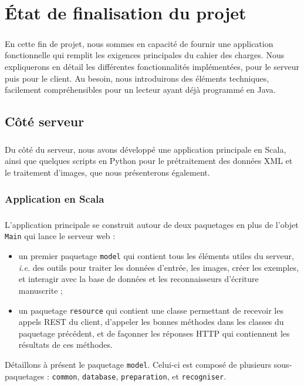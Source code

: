 \chapter{État de finalisation du projet}

\paragraph{}
En cette fin de projet, nous sommes en capacité de fournir une application fonctionnelle qui remplit les exigences principales du cahier des charges. Nous expliquerons en détail les différentes fonctionnalités implémentées, pour le serveur puis pour le client. Au besoin, nous introduirons des éléments techniques, facilement compréhensibles pour un lecteur ayant déjà programmé en Java.

\section{Côté serveur}

\paragraph{}
Du côté du serveur, nous avons développé une application principale en Scala, ainsi que quelques scripts en Python pour le prétraitement des données XML et le traitement d'images, que nous présenterons également.

\subsection{Application en Scala}

\paragraph{}
L'application principale se construit autour de deux paquetages en plus de l'objet \texttt{Main} qui lance le serveur web :
\begin{itemize}
\item un premier paquetage \texttt{model} qui contient tous les éléments utiles du serveur, \textit{i.e.} des outils pour traiter les données d'entrée, les images, créer les exemples, et interagir avec la base de données et les reconnaisseurs d'écriture manuscrite ;
\item un paquetage \texttt{resource} qui contient une classe permettant de recevoir les appels REST du client, d'appeler les bonnes méthodes dans les classes du paquetage précédent, et de façonner les réponses HTTP qui contiennent les résultats de ces méthodes.
\end{itemize}
Détaillons à présent le paquetage \texttt{model}. Celui-ci est composé de plusieurs sous-paquetages : \texttt{common}, \texttt{database}, \texttt{preparation}, et \texttt{recogniser}.

